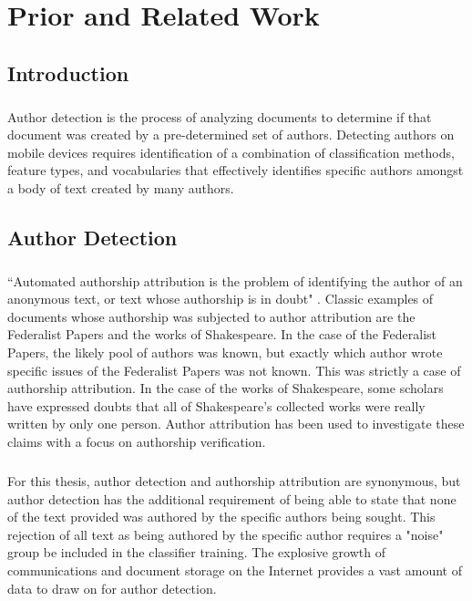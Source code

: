 \chapter {Prior and Related Work}

\section {Introduction}
	\paragraph{}Author detection is the process of analyzing documents to determine if that document was created by a pre-determined set of authors.   Detecting authors on mobile devices requires identification of a combination of classification methods, feature types, and vocabularies that effectively identifies specific authors amongst a body of text created by many authors.

\section {Author Detection}
	\paragraph{}``Automated authorship attribution is the problem of identifying the author of an anonymous text, or text whose authorship is in doubt" \cite{love_attributing_2002}.  Classic examples of documents whose authorship was subjected to author attribution are the Federalist Papers and the works of Shakespeare.  In the case of the Federalist Papers, the likely pool of authors was known, but exactly which author wrote specific issues of the Federalist Papers was not known.\cite{mosteller_inference_1963}  This was strictly a case of authorship attribution. In the case of the works of Shakespeare, some scholars have expressed doubts that all of Shakespeare's collected works were really written by only one person.\cite{koppel_authorship_2004}  Author attribution has been used to investigate these claims with a focus on authorship verification.
	\paragraph{} For this thesis, author detection and authorship attribution are synonymous, but author detection has the additional requirement of being able to state that none of the text provided was authored by the specific authors being sought. This rejection of all text as being authored by the specific author requires a "noise" group be included in the classifier training. The explosive growth of communications and document storage on the Internet provides a vast amount of data to draw on for author detection.  
